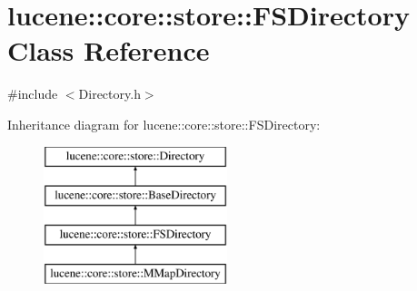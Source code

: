 \hypertarget{classlucene_1_1core_1_1store_1_1FSDirectory}{}\section{lucene\+:\+:core\+:\+:store\+:\+:F\+S\+Directory Class Reference}
\label{classlucene_1_1core_1_1store_1_1FSDirectory}


{\ttfamily \#include $<$Directory.\+h$>$}

Inheritance diagram for lucene\+:\+:core\+:\+:store\+:\+:F\+S\+Directory\+:\begin{figure}[H]
\begin{center}
\leavevmode
\includegraphics[height=4.000000cm]{classlucene_1_1core_1_1store_1_1FSDirectory}
\end{center}
\end{figure}
